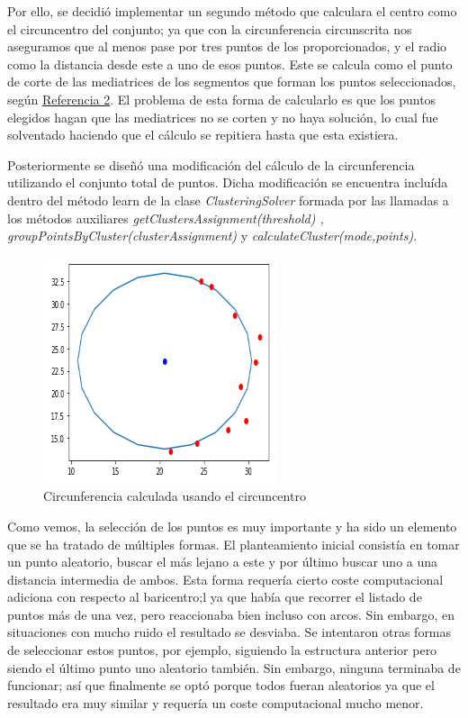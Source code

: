 \documentclass[conference,a4paper]{IEEEtran}
\begin{document}
Por ello, se decidió implementar un segundo método que calculara el centro como el circuncentro del conjunto; ya que con la circunferencia circunscrita nos aseguramos que al menos pase por tres puntos de los proporcionados, y el radio como la distancia desde este a uno de esos puntos. Este se calcula como el punto de corte de las mediatrices de los segmentos que forman los puntos seleccionados, según \hyperref[bib:georgeSeif]{Referencia 2}. El problema de esta forma de calcularlo es que los puntos elegidos hagan que las mediatrices no se corten y no haya solución, lo cual fue solventado haciendo que el cálculo se repitiera hasta que esta existiera.

Posteriormente se diseñó una modificación del cálculo de la circunferencia utilizando el conjunto total de puntos. Dicha modificación se encuentra incluída dentro del método learn de la clase \textit{ClusteringSolver}  formada por las llamadas a los métodos auxiliares \textit{getClustersAssignment(threshold) , groupPointsByCluster(clusterAssignment)} y \textit{calculateCluster(mode,points)}.

\newpage
\begin{figure}[H]
\centering
\includegraphics[scale=0.8]{ArcoCircuncentroResultado}
\caption{Circunferencia calculada usando el circuncentro}
\end{figure}

Como vemos, la selección de los puntos es muy importante y ha sido un elemento que se ha tratado de múltiples formas. El planteamiento inicial  consistía en tomar un punto aleatorio, buscar el más lejano a este y por último buscar uno a una distancia intermedia de ambos. Esta forma requería cierto coste computacional adiciona con respecto al baricentro;l ya que había que recorrer el listado de puntos más de una vez, pero reaccionaba bien incluso con arcos. Sin embargo, en situaciones con mucho ruido el resultado se desviaba. Se intentaron otras formas de seleccionar estos puntos, por ejemplo, siguiendo la estructura anterior pero siendo el último punto uno aleatorio también. Sin embargo, ninguna terminaba de funcionar; así que finalmente se optó porque todos fueran aleatorios ya que el resultado era muy similar y requería un coste computacional mucho menor.
\end{document}
